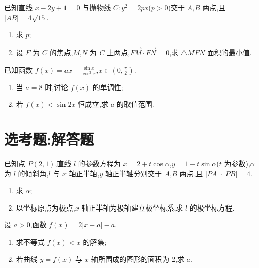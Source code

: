 \begin{problem}
已知直线 \( x-2y+1=0 \) 与抛物线 \( C:y^2=2px \)(\( p>0 \))交于 \(A\),\(B\) 两点,且 \( \lvert AB \rvert=4\sqrt{15} \).

\begin{enumerate}
\item 求 \( p \);
\item 设 \(F\) 为 \(C\) 的焦点,\(M\),\(N\) 为 \(C\) 上两点,\( \overrightarrow{FM}\cdot\overrightarrow{FN}=0 \),求 \( \triangle MFN \) 面积的最小值.
\end{enumerate}
\end{problem}

\begin{problem}
已知函数 \( f(x)=ax-\frac{\sin x}{\cos^3x} \),\( x\in\left( 0,\frac{\pi}{2} \right) \).

\begin{enumerate}
\item 当 \( a=8 \) 时,讨论 \( f(x) \) 的单调性;
\item 若 \( f(x)<\sin2x \) 恒成立,求 \( a \) 的取值范围.
\end{enumerate}
\end{problem}

\section{选考题:解答题}

\begin{problem}
已知点 \( P(2,1) \),直线 \( l \) 的参数方程为 \( x=2+t\cos\alpha \),\( y=1+t\sin\alpha \)(\( t \) 为参数),\( \alpha \) 为 \( l \) 的倾斜角,\( l \) 与 \( x \) 轴正半轴,\( y \) 轴正半轴分别交于 \(A\),\(B\) 两点,且 \( \lvert PA \rvert\cdot\lvert PB \rvert=4 \).

\begin{enumerate}
\item 求 \( \alpha \);
\item 以坐标原点为极点,\( x \) 轴正半轴为极轴建立极坐标系,求 \( l \) 的极坐标方程.
\end{enumerate}
\end{problem}

\begin{problem}
设 \( a>0 \),函数 \( f(x)=2\lvert x-a \rvert-a \).

\begin{enumerate}
\item 求不等式 \( f(x)<x \) 的解集;
\item 若曲线 \( y=f(x) \) 与 \( x \) 轴所围成的图形的面积为 2,求 \( a \).
\end{enumerate}
\end{problem}

